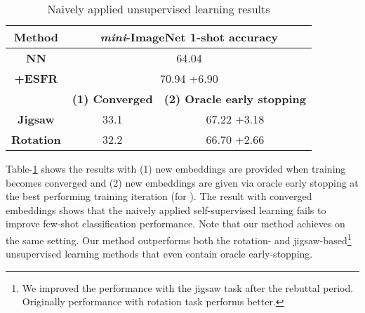 \documentclass{article}
\begin{document}
\begin{table}[h]
	\caption{Naively applied unsupervised learning results}
	\label{table:results}
	\begin{small}
		\begin{center}
			\begin{tabular}{ccc}
				\textbf{Method} & \multicolumn{2}{c}{\textbf{\textit{mini}-ImageNet 1-shot accuracy}} \\ \hline
				\textbf{NN} & \multicolumn{2}{c}{64.04} \\
				\textbf{+ESFR} & \multicolumn{2}{c}{70.94 {\scriptsize+6.90}} \\ \hline
				& \textbf{(1) Converged} & \textbf{(2) Oracle early stopping} \\ \hline
				\textbf{Jigsaw} & 33.1 & 67.22 {\scriptsize+3.18} \\
				\textbf{Rotation} & 32.2 & 66.70 {\scriptsize+2.66} \\ \hline
			\end{tabular}
		\end{center}
	\end{small}
\end{table}
Table-\ref{table:results} shows the results with (1) new embeddings are provided when training becomes converged and (2) new embeddings are given via oracle early stopping at the best performing training iteration (for ).
The result with converged embeddings shows that the naively applied self-supervised learning fails to improve few-shot classification performance.
Note that our method achieves  on the same setting.
Our method outperforms both the rotation- and jigsaw-based\footnote{We improved the performance with the jigsaw task after the rebuttal period. Originally performance with rotation task performs better.} unsupervised learning methods that even contain oracle early-stopping.
\end{document}
